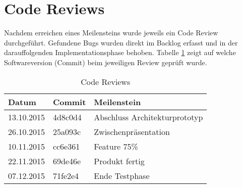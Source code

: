 \section{Code Reviews}
\label{sec:code_reviews}

Nachdem erreichen eines Meilensteins wurde jeweils ein Code Review durchgeführt. Gefundene Bugs wurden direkt im Backlog erfasst und in der darauffolgenden Implementationsphase behoben. Tabelle \ref{table:codeReview} zeigt auf welche Softwareversion (Commit) beim jeweiligen Review geprüft wurde.

\begin{table}[H]
\begin{tabularx}{\textwidth}{ l | l | X}
\textbf{Datum}& \textbf{Commit} & \textbf{Meilenstein}\\ \hline
13.10.2015 & 4d8c0d4 & Abschluss Architekturprototyp\\ \hline
26.10.2015 & 25a093c & Zwischenpräsentation\\ \hline
10.11.2015 & cc6e361 & Feature 75\%\\ \hline
22.11.2015 & 69de46e & Produkt fertig\\ \hline
07.12.2015 & 71fe2e4 & Ende Testphase\\ \hline
\end{tabularx}
\caption{Code Reviews}
\label{table:codeReview}
\end{table}
